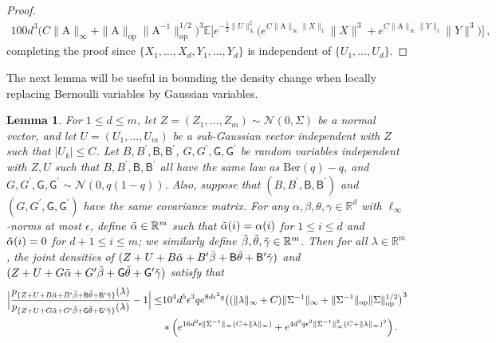\documentclass[11pt]{article}
\newtheorem{Lemma}[Theorem]{Lemma}
\numberwithin{equation}{section}
\begin{document}
\begin{proof}
\begin{align*}
    100 d^3 \big( C \| \mathrm{A} \|_{\infty} + \| \mathrm{A} \|_{\mathrm{op}} \| \mathrm{A}^{-1} \|_{\mathrm{op}}^{1/2} \big)^3 \mathbb{E} \Big[ e^{ - \frac{1}{2} \| U \|^2_{ \mathrm{A}} }  \Big(e^{ C \| \mathrm{A} \|_{\infty} \|{X}\|_{1} } \| X \|^3 + e^{  C \| \mathrm{A} \|_{\infty} \|{Y}\|_{1} } \| Y \|^3 \Big) \Big]\,,
\end{align*}
completing the proof since $\{X_1, \ldots, X_d, Y_1, \ldots, Y_d\}$ is independent of $\{U_1, \ldots, U_d\}$.
\end{proof}


The next lemma will be useful in bounding the density change when locally replacing Bernoulli variables by Gaussian variables.

\begin{Lemma} \label{lemma-substitute-one-group}
For $1 \leq d \leq m$, let $Z=(Z_1,\ldots,Z_m) \sim \mathcal{N}(0,\Sigma)$ be a normal vector, and let $U=(U_1,\ldots,U_m)$ be a sub-Gaussian vector independent with $Z$ such that $|U_{k}| \leq C$. Let $B,B^{\prime},\mathsf{B},\mathsf{B}^{\prime}$, $G,G^{\prime},\mathsf{G},\mathsf{G}^{\prime}$ be random variables independent with $Z,U$ such that $B,B^{\prime},\mathsf{B},\mathsf{B}^{\prime}$ all have the same law as $\mathrm{Ber}(q)-q$, and $G,G^{\prime},\mathsf{G},\mathsf{G}^{\prime} \sim \mathcal{N}(0,q(1-q))$. Also, suppose that $( B,B^{\prime},\mathsf{B},\mathsf{B}^{\prime})$ and $(G,G^{\prime},\mathsf{G},\mathsf{G}^{\prime})$ have the same covariance matrix. For any $\alpha,\beta,\theta,\gamma \in \mathbb{R}^d$ with $\ell_\infty$-norms at most $\epsilon$, define $\Tilde \alpha \in \mathbb R^m$ such that $\Tilde{\alpha}(i) = \alpha(i)$ for $1 \leq i \leq d$ and $\Tilde{\alpha} (i)=0$ for $d+1\leq i \leq m$; we similarly define $\Tilde{\beta},\Tilde{\theta},\Tilde{\gamma} \in \mathbb R^m$. Then for all $\lambda\in \mathbb R^m$, the joint densities of  $( Z+U+B \Tilde{\alpha} + B^{\prime} \Tilde{\beta} + \mathsf{B} \Tilde{\theta} + \mathsf{B}^{\prime} \Tilde{\gamma}  )$ and $( Z+U+G \Tilde{\alpha} + G^{\prime} \Tilde{\beta} + \mathsf{G} \Tilde{\theta} + \mathsf{G}^{\prime} \Tilde{\gamma} )$ satisfy that
\begin{align*}
    \Big| \frac{ p_{\{ Z+U+B \Tilde{\alpha} + B^{\prime} \Tilde{\beta} + \mathsf{B} \Tilde{\theta} + \mathsf{B}^{\prime} \Tilde{\gamma} \}} (\lambda) }{ p_{\{ Z+U+G \Tilde{\alpha} + G^{\prime} \Tilde{\beta} + \mathsf{G} \Tilde{\theta} + \mathsf{G}^{\prime} \Tilde{\gamma} \}} (\lambda) } - 1 \Big| \leq & 10^4 d^{5} \epsilon^3 q e^{8d \epsilon^2 q} \big( (\| \lambda \|_{\infty}+C) \| \Sigma^{-1} \|_{\infty} + \| \Sigma^{-1}\|_{\mathrm{op}} \| \Sigma \|_{ \mathrm{op}}^{1/2} \big)^3  \\
    & * \Big( e^{ 16d^2 \epsilon \| \Sigma^{-1} \|_{\infty} (C+\| \lambda \|_{\infty} ) } + e^{  4d^3 q \epsilon^2 \| \Sigma^{-1} \|^2_{\infty} (C+\| \lambda \|_{\infty})^2 } \Big)   \,.
\end{align*}
\end{Lemma}
\end{document}
